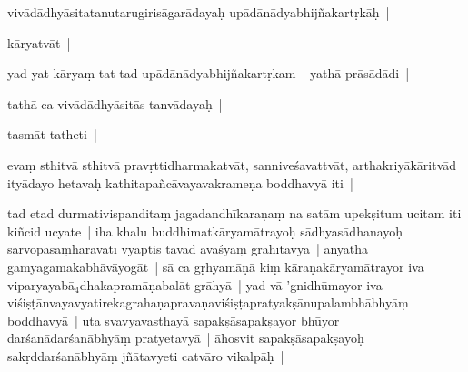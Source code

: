\documentclass[article,12pt,a4paper]{memoir}%
\newcounter{parCount}
\begin{document}
	  \pstart \leavevmode%
	vivādādhyāsitatanutarugirisāgarādayaḥ upādānādyabhijñakartṛkāḥ |
	{}
	\pend%
      

	  \pstart \leavevmode%
	kāryatvāt |
	{}
	\pend%
      

	  \pstart \leavevmode%
	yad yat kāryaṃ tat tad upādānādyabhijñakartṛkam | yathā prāsādādi |
	{}
	\pend%
      

	  \pstart \leavevmode%
	tathā ca vivādādhyāsitās tanvādayaḥ |
	{}
	\pend%
      

	  \pstart \leavevmode%
	tasmāt tatheti |
	{}
	\pend%
      

	  \pstart \leavevmode%
	evaṃ sthitvā sthitvā pravṛttidharmakatvāt, sanniveśavattvāt, arthakriyākāritvād ityādayo hetavaḥ kathitapañcāvayavakrameṇa boddhavyā iti |
	{}
	\pend%
      \label{īsd-uttarapakṣa}
	  
	\label{īsd-vyāptigrahaṇa}
	  
	

	  \pstart \leavevmode%
	\label{thakur75-40.16}tad etad durmativispanditaṃ jagadandhīkaraṇaṃ na satām upekṣitum ucitam iti kiñcid ucyate | iha khalu buddhimatkāryamātrayoḥ sādhyasādhanayoḥ sarvopasaṃhāravatī vyāptis tāvad avaśyaṃ grahītavyā | anyathā gamyagamakabhāvāyogāt | sā ca gṛhyamāṇā kiṃ kāraṇakāryamātrayor iva viparyayabā{\tiny $_{4}$}dhakapramāṇabalāt grāhyā | yad vā 'gnidhūmayor iva viśiṣṭānvayavyatirekagrahaṇapravaṇaviśiṣṭapratyakṣānupalambhābhyāṃ boddhavyā | uta svavyavasthayā sapakṣāsapakṣayor bhūyor darśanādarśanābhyāṃ pratyetavyā | āhosvit sapakṣāsapakṣayoḥ sakṛddarśanābhyāṃ jñātavyeti catvāro vikalpāḥ |
	{}
	\pend%
      
\end{document}
